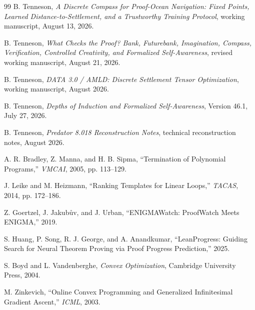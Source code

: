 \documentclass[11pt]{article}
\begin{document}
\begin{thebibliography}{99}
B. Tenneson, \emph{A Discrete Compass for Proof-Ocean Navigation: Fixed Points, Learned Distance-to-Settlement, and a Trustworthy Training Protocol}, working manuscript, August 13, 2026.

B. Tenneson, \emph{What Checks the Proof? Bank, Futurebank, Imagination, Compass, Verification, Controlled Creativity, and Formalized Self-Awareness}, revised working manuscript, August 21, 2026.

B. Tenneson, \emph{DATA 3.0 / AMLD: Discrete Settlement Tensor Optimization}, working manuscript, August 2026.

B. Tenneson, \emph{Depths of Induction and Formalized Self-Awareness}, Version 46.1, July 27, 2026.

B. Tenneson, \emph{Predator 8.018 Reconstruction Notes}, technical reconstruction notes, August 2026.

A. R. Bradley, Z. Manna, and H. B. Sipma, ``Termination of Polynomial Programs,'' \emph{VMCAI}, 2005, pp. 113--129.

J. Leike and M. Heizmann, ``Ranking Templates for Linear Loops,'' \emph{TACAS}, 2014, pp. 172--186.

Z. Goertzel, J. Jakub\r{u}v, and J. Urban, ``ENIGMAWatch: ProofWatch Meets ENIGMA,'' 2019.

S. Huang, P. Song, R. J. George, and A. Anandkumar, ``LeanProgress: Guiding Search for Neural Theorem Proving via Proof Progress Prediction,'' 2025.

S. Boyd and L. Vandenberghe, \emph{Convex Optimization}, Cambridge University Press, 2004.

M. Zinkevich, ``Online Convex Programming and Generalized Infinitesimal Gradient Ascent,'' \emph{ICML}, 2003.
\end{thebibliography}
\end{document}
